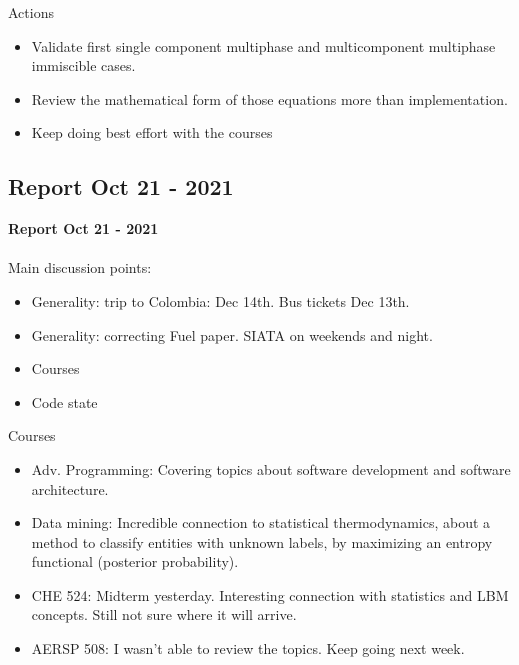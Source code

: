 \documentclass{beamer}
\begin{document}
	\begin{frame}{Actions}
		\begin{itemize}
			\item Validate first single component multiphase and multicomponent multiphase immiscible cases.
			\item Review the mathematical form of those equations more than implementation.
			\item Keep doing best effort with the courses
		\end{itemize}
	\end{frame}


	\subsection{Report Oct 21 - 2021}
	\justifying
	\begin{frame}
		\textbf{Report Oct 21 - 2021}\\~\\
		Main discussion points:
		\begin{itemize}
			\item Generality: trip to Colombia: Dec 14th. Bus tickets Dec 13th.
			\item Generality: correcting Fuel paper. SIATA on weekends and night.
			\item Courses
			\item Code state
		\end{itemize}
	\end{frame}
	
	\begin{frame}{Courses}
		\begin{itemize}
			\item Adv. Programming: Covering topics about software development and software architecture. 
			\item Data mining: Incredible connection to statistical thermodynamics, about a method to classify entities with unknown labels, by maximizing an entropy functional (posterior probability).
			\item CHE 524: Midterm yesterday. Interesting connection with statistics and LBM concepts. Still not sure where it will arrive.
			\item AERSP 508: I wasn't able to review the topics. Keep going next week.
		\end{itemize}
	\end{frame}
	
\end{document}
